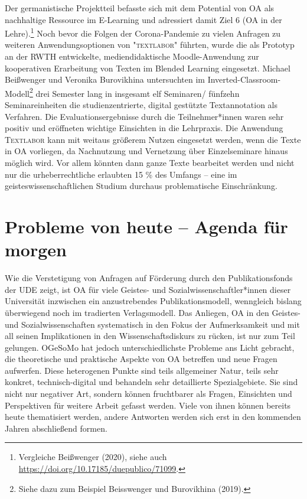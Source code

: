 \documentclass[a4paper,
fontsize=11pt,
oneside,
numbers=noperiodatend,
parskip=half-,
bibliography=totoc,
final
]{scrartcl}
\begin{document}
Der germanistische Projektteil befasste sich mit dem Potential von OA
als nachhaltige Ressource im E-Learning und adressiert damit Ziel 6 (OA
in der Lehre).\footnote{Vergleiche Beißwenger (2020), siehe auch
  \url{https://doi.org/10.17185/duepublico/71099}.} Noch bevor die
Folgen der Corona-Pandemie zu vielen Anfragen zu weiteren
Anwendungsoptionen von "\textsc{textlabor"} führten, wurde die als
Prototyp an der RWTH entwickelte, mediendidaktische Moodle-Anwen\-dung zur
kooperativen Erarbeitung von Texten im Blended Learning eingesetzt.
Michael Beißwenger und Veronika Burovikhina untersuchten im
Inverted-Classroom-Modell\footnote{Siehe dazu zum Beispiel Beisswenger
  und Burovikhina (2019).} drei Semester lang in insgesamt elf
Seminaren/ fünfzehn Seminareinheiten die studienzentrierte, digital
gestützte Textannotation als Verfahren. Die Evaluationsergebnisse durch
die Teilnehmer*innen waren sehr positiv und eröffneten wichtige
Einsichten in die Lehrpraxis. Die Anwendung \textsc{Textlabor} kann mit
weitaus größerem Nutzen eingesetzt werden, wenn die Texte in OA
vorliegen, da Nachnutzung und Vernetzung über Einzelseminare hinaus
möglich wird. Vor allem könnten dann ganze Texte bearbeitet werden und
nicht nur die urheberrechtliche erlaubten 15 \% des Umfangs -- eine im
geisteswissenschaftlichen Studium durchaus problematische Einschränkung.

\hypertarget{probleme-von-heute-agenda-fuxfcr-morgen}{%
\section{Probleme von heute -- Agenda für
morgen}\label{probleme-von-heute-agenda-fuxfcr-morgen}}

Wie die Verstetigung von Anfragen auf Förderung durch den
Publikationsfonds der UDE zeigt, ist OA für viele Geistes- und
Sozialwissenschaftler*innen dieser Universität inzwischen ein
anzustrebendes Publikationsmodell, wenngleich bislang überwiegend noch
im tradierten Verlagsmodell. Das Anliegen, OA in den Geistes- und
Sozialwissenschaften systematisch in den Fokus der Aufmerksamkeit und
mit all seinen Implikationen in den Wissenschaftsdiskurs zu rücken, ist
nur zum Teil gelungen. OGeSoMo hat jedoch unterschiedlichste Probleme
ans Licht gebracht, die theoretische und praktische Aspekte von OA
betreffen und neue Fragen aufwerfen. Diese heterogenen Punkte sind teils
allgemeiner Natur, teils sehr konkret, technisch-digital und behandeln
sehr detaillierte Spezialgebiete. Sie sind nicht nur negativer Art,
sondern können fruchtbarer als Fragen, Einsichten und Perspektiven für
weitere Arbeit gefasst werden. Viele von ihnen können bereits heute
thematisiert werden, andere Antworten werden sich erst in den kommenden
Jahren abschließend formen.
\end{document}
